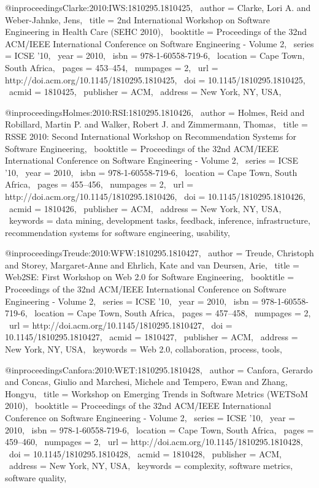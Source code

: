@inproceedings{Clarke:2010:IWS:1810295.1810425,
 author = {Clarke, Lori A. and Weber-Jahnke, Jens},
 title = {2nd International Workshop on Software Engineering in Health Care (SEHC 2010)},
 booktitle = {Proceedings of the 32nd ACM/IEEE International Conference on Software Engineering - Volume 2},
 series = {ICSE '10},
 year = {2010},
 isbn = {978-1-60558-719-6},
 location = {Cape Town, South Africa},
 pages = {453--454},
 numpages = {2},
 url = {http://doi.acm.org/10.1145/1810295.1810425},
 doi = {10.1145/1810295.1810425},
 acmid = {1810425},
 publisher = {ACM},
 address = {New York, NY, USA},
} 

@inproceedings{Holmes:2010:RSI:1810295.1810426,
 author = {Holmes, Reid and Robillard, Martin P. and Walker, Robert J. and Zimmermann, Thomas},
 title = {RSSE 2010: Second International Workshop on Recommendation Systems for Software Engineering},
 booktitle = {Proceedings of the 32nd ACM/IEEE International Conference on Software Engineering - Volume 2},
 series = {ICSE '10},
 year = {2010},
 isbn = {978-1-60558-719-6},
 location = {Cape Town, South Africa},
 pages = {455--456},
 numpages = {2},
 url = {http://doi.acm.org/10.1145/1810295.1810426},
 doi = {10.1145/1810295.1810426},
 acmid = {1810426},
 publisher = {ACM},
 address = {New York, NY, USA},
 keywords = {data mining, development tasks, feedback, inference, infrastructure, recommendation systems for software engineering, usability},
} 

@inproceedings{Treude:2010:WFW:1810295.1810427,
 author = {Treude, Christoph and Storey, Margaret-Anne and Ehrlich, Kate and van Deursen, Arie},
 title = {Web2SE: First Workshop on Web 2.0 for Software Engineering},
 booktitle = {Proceedings of the 32nd ACM/IEEE International Conference on Software Engineering - Volume 2},
 series = {ICSE '10},
 year = {2010},
 isbn = {978-1-60558-719-6},
 location = {Cape Town, South Africa},
 pages = {457--458},
 numpages = {2},
 url = {http://doi.acm.org/10.1145/1810295.1810427},
 doi = {10.1145/1810295.1810427},
 acmid = {1810427},
 publisher = {ACM},
 address = {New York, NY, USA},
 keywords = {Web 2.0, collaboration, process, tools},
} 

@inproceedings{Canfora:2010:WET:1810295.1810428,
 author = {Canfora, Gerardo and Concas, Giulio and Marchesi, Michele and Tempero, Ewan and Zhang, Hongyu},
 title = {Workshop on Emerging Trends in Software Metrics (WETSoM 2010)},
 booktitle = {Proceedings of the 32nd ACM/IEEE International Conference on Software Engineering - Volume 2},
 series = {ICSE '10},
 year = {2010},
 isbn = {978-1-60558-719-6},
 location = {Cape Town, South Africa},
 pages = {459--460},
 numpages = {2},
 url = {http://doi.acm.org/10.1145/1810295.1810428},
 doi = {10.1145/1810295.1810428},
 acmid = {1810428},
 publisher = {ACM},
 address = {New York, NY, USA},
 keywords = {complexity, software metrics, software quality},
} 

